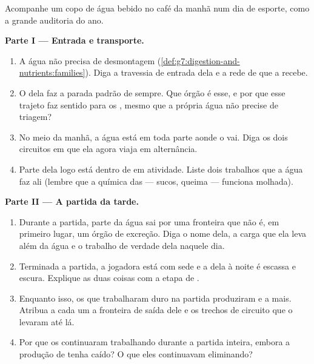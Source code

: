 \begin{problem}\label{pb:g7:removing-wastes:1}
Acompanhe um copo de água bebido no café da manhã num dia de esporte,
como a grande auditoria do ano.

\medskip\noindent\textbf{Parte I --- Entrada e transporte.}
\begin{enumerate}
  \item A água não precisa de desmontagem
        (\cref{def:g7:digestion-and-nutrients:families}). Diga a
        travessia de entrada dela e a rede de  que a recebe.
  \item O  dela faz a parada padrão de sempre. Que órgão é
        esse, e por que esse trajeto faz sentido para os ,
        mesmo que a própria água não precise de triagem?
  \item No meio da manhã, a água está em toda parte aonde o 
        vai. Diga os dois circuitos em que ela agora viaja em
        alternância.
  \item Parte dela logo está dentro de  em atividade. Liste
        dois trabalhos que a água faz ali (lembre que a química das
         --- sucos, queima --- funciona molhada).
\end{enumerate}

\medskip\noindent\textbf{Parte II --- A partida da
tarde.}
\begin{enumerate}[resume]
  \item Durante a partida, parte da água sai por uma fronteira que
        não é, em primeiro lugar, um órgão de excreção. Diga o nome
        dela, a carga que ela leva além da água e o trabalho de
        verdade dela naquele dia.
  \item Terminada a partida, a jogadora está com sede e a  dela
        à noite é escassa e escura. Explique as duas coisas com a
        etapa de .
  \item Enquanto isso, os  que trabalharam duro na partida
        produziram  e  a mais. Atribua a cada um a
        fronteira de saída dele e os trechos de circuito que o
        levaram até lá.
  \item Por que os  continuaram trabalhando durante a partida
        inteira, embora a produção de  tenha caído? O que eles
        continuavam eliminando?
\end{enumerate}


\end{problem}
